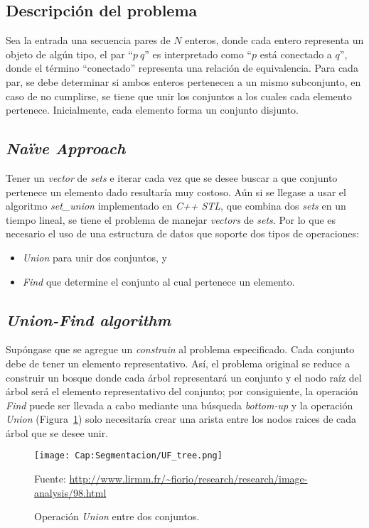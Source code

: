 \subsection{Descripción del problema}
Sea la entrada una secuencia pares de $N$ enteros, donde cada entero 
representa un objeto de algún tipo, el par ``$p~q$'' es interpretado como 
``$p$ está conectado a $q$'', donde el término ``conectado'' representa una 
relación de equivalencia. Para cada par, se debe determinar si ambos enteros
pertenecen a un mismo subconjunto, en caso de no cumplirse, se tiene que unir 
los conjuntos a los cuales cada elemento pertenece. Inicialmente, cada 
elemento forma un conjunto disjunto.

\subsection{\textit{Naïve Approach}}
Tener un \textit{vector} de \textit{sets} e iterar cada vez que se desee
buscar a que conjunto pertenece un elemento dado resultaría muy costoso. Aún 
si se llegase a usar el algoritmo \textit{set\_union} implementado en 
\textit{C++ STL}, que combina dos \textit{sets} en un tiempo lineal, se tiene 
el problema de manejar \textit{vectors} de \textit{sets}. Por lo que es 
necesario el uso de una estructura de datos que soporte dos tipos de 
operaciones:
\begin{itemize}
	\item \textit{Union} para unir dos conjuntos, y
	\item \textit{Find} que determine el conjunto al cual pertenece un elemento.
\end{itemize}

\subsection{\textit{Union-Find algorithm}}
Supóngase que se agregue un \textit{constrain} al problema especificado. Cada
conjunto debe de tener un elemento representativo. 
Así, el problema original se reduce a construir un bosque donde cada árbol 
representará un conjunto y el nodo raíz del árbol será el elemento 
representativo del conjunto; por consiguiente, la operación \textit{Find} 
puede ser llevada a cabo mediante una búsqueda \textit{bottom-up} y la 
operación \textit{Union} (Figura~\ref{fig:cap-segmentacion:UF_tree}) solo 
necesitaría crear una arista entre los nodos raices de cada árbol que se
desee unir.\cite{Wayne:2011:Alg}

\begin{figure}[h!]
	\centering
	\texttt{[image: Cap:Segmentacion/UF\_tree.png]}
	\caption{Operación \textit{Union} entre dos conjuntos.}\tiny{Fuente: 
	\url{http://www.lirmm.fr/~fiorio/research/research/image-analysis/98.html}}
	\label{fig:cap-segmentacion:UF_tree}
\end{figure}

